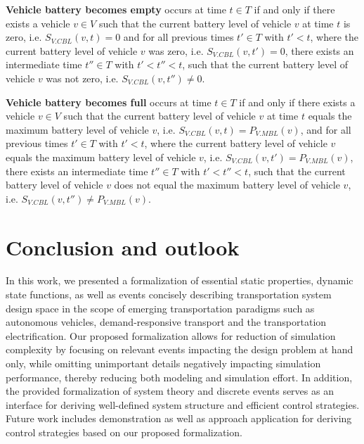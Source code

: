 \documentclass[graybox]{svmult}
\begin{document}
\vspace{2mm}
\noindent \textbf{Vehicle battery becomes empty} occurs at time $t \in T$ if and only if there exists a vehicle $v \in V$ such that the current battery level of vehicle $v$ at time $t$ is zero, i.e. $S_{V.CBL}(v,t) = 0$ and for all previous times $t' \in T$ with $t' < t$, where the current battery level of vehicle $v$ was zero, i.e. $S_{V.CBL}(v,t') = 0$, there exists an intermediate time $t'' \in T$ with $t' < t'' < t$, such that the current battery level of vehicle $v$ was not zero, i.e. $S_{V.CBL}(v,t'') \neq 0$.

\vspace{2mm}
\noindent \textbf{Vehicle battery becomes full} occurs at time $t \in T$ if and only if there exists a vehicle $v \in V$ such that the current battery level of vehicle $v$ at time $t$ equals the maximum battery level of vehicle $v$, i.e. $S_{V.CBL}(v,t) = P_{V.MBL}(v)$, and for all previous times $t' \in T$ with $t' < t$, where the current battery level of vehicle $v$ equals the maximum battery level of vehicle $v$, i.e. $S_{V.CBL}(v,t') = P_{V.MBL}(v)$, there exists an intermediate time $t'' \in T$ with $t' < t'' < t$, such that the current battery level of vehicle $v$ does not equal the maximum battery level of vehicle $v$, i.e. $S_{V.CBL}(v,t'') \neq P_{V.MBL}(v)$.

\section{Conclusion and outlook}
\label{sec:con}

In this work, we presented a formalization of essential static properties, dynamic state functions, as well as events concisely describing transportation system design space in the scope of emerging transportation paradigms such as autonomous vehicles, demand-responsive transport and the transportation electrification.
Our proposed formalization allows for reduction of simulation complexity by focusing on relevant events impacting the design problem at hand only, while omitting unimportant details negatively impacting simulation performance, thereby reducing both modeling and simulation effort.
In addition, the provided formalization of system theory and discrete events serves as an interface for deriving well-defined system structure and efficient control strategies.
Future work includes demonstration as well as approach application for deriving control strategies based on our proposed formalization.



\end{document}
